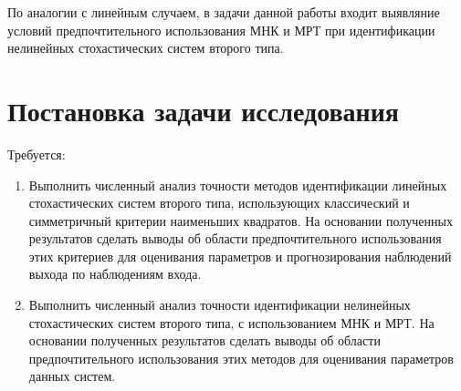 По аналогии с линейным случаем, в задачи данной работы входит
выявляние условий предпочтительного использования МНК и МРТ
при идентификации нелинейных стохастических систем второго типа.

\section{Постановка задачи исследования}

Требуется:
\begin{enumerate}
\item Выполнить численный анализ точности методов идентификации
  линейных стохастических систем второго типа,
  использующих классический и симметричный критерии наименьших квадратов.
  На основании полученных результатов сделать выводы об области предпочтительного
  использования этих критериев для оценивания параметров и
  прогнозирования наблюдений выхода по наблюдениям входа.
\item Выполнить численный анализ точности идентификации
  нелинейных стохастических систем второго типа,
  с использованием МНК и МРТ.
  На основании полученных результатов сделать выводы об области предпочтительного
  использования этих методов для оценивания параметров данных систем.
\end{enumerate}
